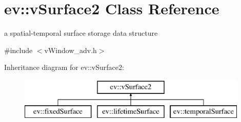 \hypertarget{classev_1_1vSurface2}{}\section{ev\+:\+:v\+Surface2 Class Reference}
\label{classev_1_1vSurface2}


a spatial-\/temporal surface storage data structure  




{\ttfamily \#include $<$v\+Window\+\_\+adv.\+h$>$}

Inheritance diagram for ev\+:\+:v\+Surface2\+:\begin{figure}[H]
\begin{center}
\leavevmode
\includegraphics[height=2.000000cm]{classev_1_1vSurface2}
\end{center}
\end{figure}
